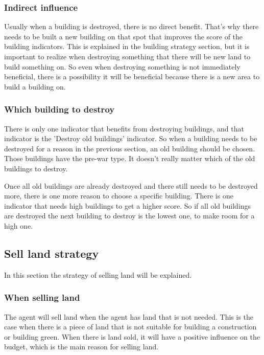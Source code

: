 \subsubsection{Indirect influence}
Usually when a building is destroyed, there is no direct benefit. That's why there needs to be built a new building on that spot that improves the score of the building indicators. This is explained in the building strategy section, but it is important to realize when destroying something that there will be new land to build something on. So even when destroying something is not immediately beneficial, there is a possibility it will be beneficial because there is a new area to build a building on.

\subsubsection{Which building to destroy}
There is only one indicator that benefits from destroying buildings, and that indicator is the 'Destroy old buildings' indicator. So when a building needs to be destroyed for a reason in the previous section, an old building should be chosen. Those buildings have the pre-war type. It doesn't really matter which of the old buildings to destroy. 

Once all old buildings are already destroyed and there still needs to be destroyed more, there is one more reason to choose a specific building. There is one indicator that needs high buildings to get a higher score. So if all old buildings are destroyed the next building to destroy is the lowest one, to make room for a high one.

\subsection{Sell land strategy}
In this section the strategy of selling land will be explained. 

\subsubsection{When selling land}
The agent will sell land when the agent has land that is not needed. This is the case when there is a piece of land that is not suitable for building a construction or building green. When there is land sold, it will have a positive influence on the budget, which is the main reason for selling land.
